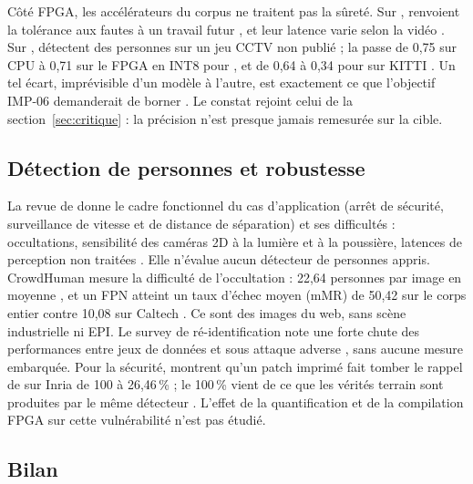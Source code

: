 Côté FPGA, les accélérateurs  du corpus ne traitent pas la sûreté. Sur ,
\citet{2026-fata-low-cost-fpga-enhanced-cnn} renvoient la tolérance aux fautes à un travail
futur , et leur latence varie selon la vidéo . Sur ,
\citet{arxiv-2607.13106-no-attention-no-problem-dpu}\pp{} détectent des personnes sur un jeu
CCTV non publié ; la  passe de 0,75 sur CPU à 0,71 sur le FPGA en INT8 pour
, et de 0,64 à 0,34 pour  sur KITTI . Un tel écart, imprévisible
d'un modèle à l'autre, est exactement ce que l'objectif IMP-06 demanderait de borner
\deduit. Le constat rejoint celui de la section~\ref{sec:critique} : la précision n'est
presque jamais remesurée sur la cible.

\subsection{Détection de personnes et robustesse}

La revue de \citet{2018-halme-review-vision-safety-systems-human} donne le cadre fonctionnel
du cas d'application (arrêt de sécurité, surveillance de vitesse et de distance de
séparation) et ses difficultés : occultations, sensibilité des caméras 2D à la lumière et à
la poussière, latences de perception non traitées . Elle n'évalue aucun détecteur de
personnes appris. CrowdHuman \citep{arxiv-1805.00123-crowdhuman-benchmark-detecting-human-crowd}\pp{}
mesure la difficulté de l'occultation : 22,64 personnes par image en moyenne ,
et un FPN atteint un taux d'échec moyen (mMR) de 50,42 sur le corps entier contre 10,08 sur
Caltech . Ce sont des images du web, sans scène industrielle ni EPI. Le survey
de ré-identification \citep{arxiv-2001.04193-deep-learning-person-re-identification}\pp{}
note une forte chute des performances entre jeux de données et sous attaque adverse
, sans aucune mesure embarquée. Pour la sécurité,
\citet{arxiv-1904.08653-fooling-automated-surveillance-cameras-adversarial}\pp{} montrent
qu'un patch imprimé fait tomber le rappel de  sur Inria de 100 à 26,46\,\%
 ; le 100\,\% vient de ce que les vérités terrain sont produites par le même
détecteur . L'effet de la quantification et de la compilation FPGA sur cette
vulnérabilité n'est pas étudié.

\subsection{Bilan}

